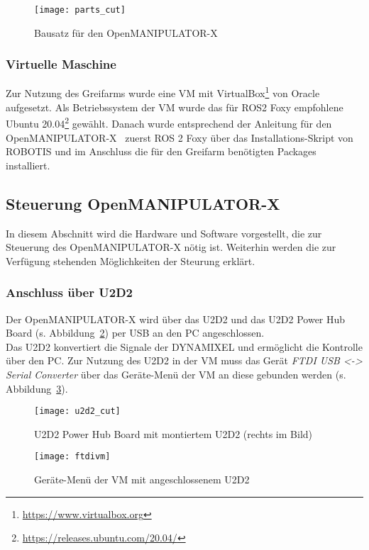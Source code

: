 \begin{figure}[ht!]
\centering
\texttt{[image: parts\_cut]}
\caption{Bausatz für den OpenMANIPULATOR-X}
\label{fig:omxparts}
\end{figure}
\subsubsection{Virtuelle Maschine}
Zur Nutzung des Greifarms wurde eine \acf{VM} mit VirtualBox{\footnote{\url{https://www.virtualbox.org}}} von Oracle aufgesetzt.
Als Betriebssystem der \ac{VM} wurde das für ROS2 Foxy empfohlene~\citep{foxyreq} Ubuntu 20.04\footnote{\url{https://releases.ubuntu.com/20.04/}} gewählt.
Danach wurde entsprechend der Anleitung für den OpenMANIPULATOR-X~\citep{foxyinstall} zuerst ROS 2 Foxy über das Installations-Skript von ROBOTIS und im Anschluss die für den Greifarm benötigten Packages installiert.

\subsection{Steuerung OpenMANIPULATOR-X}
In diesem Abschnitt wird die Hardware und Software vorgestellt, die zur Steuerung des OpenMANIPULATOR-X nötig ist.
Weiterhin werden die zur Verfügung stehenden Möglichkeiten der Steurung erklärt.
\subsubsection{Anschluss über U2D2}{\label{u2d2}}
Der OpenMANIPULATOR-X wird über das U2D2 und das U2D2 Power Hub Board (s. Abbildung~\ref{fig:u2d2}) per USB an den PC angeschlossen.\\
Das U2D2 konvertiert die Signale der DYNAMIXEL und ermöglicht die Kontrolle über den PC.
Zur Nutzung des U2D2 in der \ac{VM} muss das Gerät \emph{FTDI USB <-> Serial Converter} über das Geräte-Menü der \ac{VM} an diese gebunden werden (s. Abbildung~\ref{fig:ftdivm}).
\begin{figure}[ht!]
\centering
\texttt{[image: u2d2\_cut]}
\caption{U2D2 Power Hub Board mit montiertem U2D2 (rechts im Bild)}
\label{fig:u2d2}
\end{figure}
\begin{figure}[ht!]
\centering
\texttt{[image: ftdivm]}
\caption{Geräte-Menü der \acs{VM} mit angeschlossenem U2D2}
\label{fig:ftdivm}
\end{figure}


